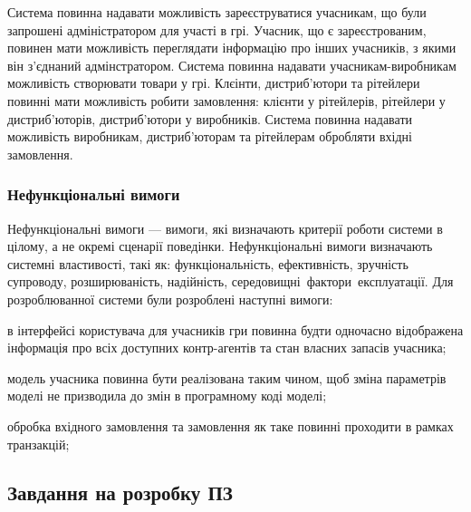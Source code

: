Система повинна надавати  можливість зареєструватися учасникам, що були запрошені адміністратором для участі в грі. Учасник, що є зареєстрованим, повинен мати можливість переглядати інформацію про інших учасників, з якими він з’єднаний адмінстратором. Система повинна надавати учасникам-виробникам можливість створювати товари у грі. Клєінти, дистриб’ютори та рітейлери повинні мати можливість робити замовлення: клієнти у рітейлерів, рітейлери у дистриб’юторів, дистриб’ютори у виробників. Система повинна надавати можливість виробникам, дистриб’юторам та рітейлерам обробляти вхідні замовлення.

        \subsubsection{Нефункціональні вимоги}
Нефункціональні вимоги --- вимоги, які визначають критерії роботи системи в цілому, а не окремі сценарії поведінки. Нефункціональні вимоги визначають системні властивості, такі як: функціональність, ефективність, зручність супроводу, розширюваність, надійність, середовищні фактори експлуатації. Для розроблюванної системи були розроблені наступні вимоги:
            \begin{longEnumerate}
\item в інтерфейсі користувача для учасників гри повинна будти одночасно відображена інформація про всіх доступних контр-агентів та стан власних запасів учасника;
\item модель учасника повинна бути реалізована таким чином, щоб зміна параметрів моделі не призводила до змін в програмному коді моделі;
\item обробка вхідного замовлення та замовлення як таке повинні проходити в рамках транзакцій;
            \end{longEnumerate}  
\subsection{Завдання на розробку ПЗ}
